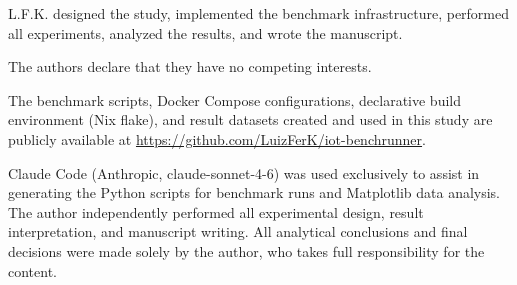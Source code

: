 \documentclass[english]{presets/sbcreviews-2025}%
\begin{document}







\begin{declarations}

  \begin{contributions}
    L.F.K. designed the study, implemented the benchmark infrastructure, performed all experiments,
    analyzed the results, and wrote the manuscript.
  \end{contributions}

  \begin{interests}
    The authors declare that they have no competing interests.
  \end{interests}

  \begin{materials}
    The benchmark scripts, Docker Compose configurations, declarative build environment
    (Nix flake), and result datasets created and used in this study are publicly available at
    \url{https://github.com/LuizFerK/iot-benchrunner}.
  \end{materials}

  \begin{aitools}
    Claude Code (Anthropic, claude-sonnet-4-6) was used exclusively to assist in generating the Python scripts for benchmark runs and Matplotlib data analysis. The author independently performed all experimental design, result interpretation, and manuscript writing. All analytical conclusions and final decisions were made solely by the author, who takes full responsibility for the content.
  \end{aitools}

\end{declarations}



\end{document}
